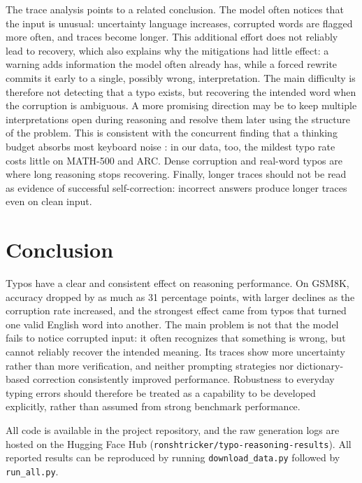 \documentclass[11pt]{article}
\begin{document}
The trace analysis points to a related conclusion. The model often notices that
the input is unusual: uncertainty language increases, corrupted words are
flagged more often, and traces become longer. This additional effort does not
reliably lead to recovery, which also explains why the mitigations had little
effect: a warning adds information the model often already has, while a forced
rewrite commits it early to a single, possibly wrong, interpretation. The main
difficulty is therefore not detecting that a typo exists, but recovering the
intended word when the corruption is ambiguous. A more promising direction may
be to keep multiple interpretations open during reasoning and resolve them
later using the structure of the problem. This is consistent with the concurrent
finding that a thinking budget absorbs most keyboard noise \citep{hu2026hive}:
in our data, too, the mildest typo rate costs little on MATH-500 and ARC. Dense
corruption and real-word typos are where long reasoning stops recovering.
Finally, longer traces should not be read as evidence of successful
self-correction: incorrect answers produce longer traces even on clean input.

\section{Conclusion}

Typos have a clear and consistent effect on reasoning performance. On GSM8K,
accuracy dropped by as much as 31 percentage points, with larger declines as the
corruption rate increased, and the strongest effect came from typos that turned
one valid English word into another. The main problem is not that the model
fails to notice corrupted input: it often recognizes that something is wrong,
but cannot reliably recover the intended meaning. Its traces show more
uncertainty rather than more verification, and neither prompting strategies nor
dictionary-based correction consistently improved performance. Robustness to
everyday typing errors should therefore be treated as a capability to be
developed explicitly, rather than assumed from strong benchmark performance.

All code is available in the project repository, and the raw generation logs are
hosted on the Hugging Face Hub (\texttt{ronshtricker/typo-reasoning-results}).
All reported results can be reproduced by running \texttt{download\_data.py}
followed by \texttt{run\_all.py}.
\end{document}
